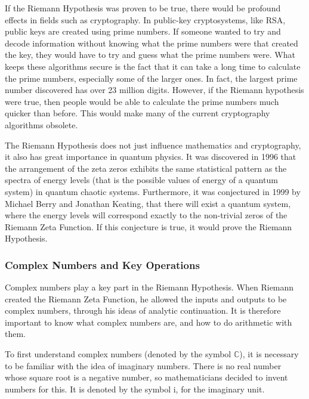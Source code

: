 \documentclass{article}
\begin{document}
If the Riemann Hypothesis was proven to be true, there would be profound effects in fields such as cryptography. In public-key cryptosystems, like RSA, public keys are created using prime numbers. If someone wanted to try and decode information without knowing what the prime numbers were that created the key, they would have to try and guess what the prime numbers were. What keeps these algorithms secure is the fact that it can take a long time to calculate the prime numbers, especially some of the larger ones. In fact, the largest prime number discovered has over 23 million digits. However, if the Riemann hypothesis were true, then people would be able to calculate the prime numbers much quicker than before. This would make many of the current cryptography algorithms obsolete.

The Riemann Hypothesis does not just influence mathematics and cryptography, it also has great importance in quantum physics. It was discovered in 1996 that the arrangement of the zeta zeros exhibits the same statistical pattern as the spectra of energy levels (that is the possible values of energy of a quantum system) in quantum chaotic systems. Furthermore, it was conjectured in 1999 by Michael Berry and Jonathan Keating, that there will exist a quantum system, where the energy levels will correspond exactly to the non-trivial zeros of the Riemann Zeta Function. If this conjecture is true, it would prove the Riemann Hypothesis.

\subsubsection{Complex Numbers and Key Operations}
Complex numbers play a key part in the Riemann Hypothesis. When Riemann created the Riemann Zeta Function, he allowed the inputs and outputs to be complex numbers, through his ideas of analytic continuation. It is therefore important to know what complex numbers are, and how to do arithmetic with them.

To first understand complex numbers (denoted by the symbol $\mathbb{C}$), it is necessary to be familiar with the idea of imaginary numbers. There is no real number whose square root is a negative number, so mathematicians decided to invent numbers for this. It is denoted by the symbol i, for the imaginary unit.
\end{document}

